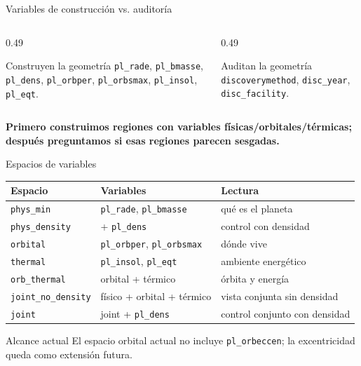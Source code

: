 \documentclass[aspectratio=169,10pt]{beamer}
\newcommand{\takeaway}[1]{\begin{center}\small\textbf{#1}\end{center}}
\begin{document}
\begin{frame}{Variables de construcci\'on vs. auditor\'ia}
  \begin{columns}[T,onlytextwidth]
    \begin{column}{0.49\textwidth}
      \begin{block}{Construyen la geometr\'ia}
        \small
        \texttt{pl\_rade}, \texttt{pl\_bmasse}, \texttt{pl\_dens}, \texttt{pl\_orbper}, \texttt{pl\_orbsmax}, \texttt{pl\_insol}, \texttt{pl\_eqt}.
      \end{block}
    \end{column}
    \begin{column}{0.49\textwidth}
      \begin{alertblock}{Auditan la geometr\'ia}
        \small
        \texttt{discoverymethod}, \texttt{disc\_year}, \texttt{disc\_facility}.
      \end{alertblock}
    \end{column}
  \end{columns}

  \vspace{0.5em}
  \takeaway{Primero construimos regiones con variables f\'isicas/orbitales/t\'ermicas; despu\'es preguntamos si esas regiones parecen sesgadas.}
\end{frame}

\begin{frame}{Espacios de variables}
  \small
  \begin{tabular}{lll}
    \toprule
    Espacio & Variables & Lectura \\
    \midrule
    \texttt{phys\_min} & \texttt{pl\_rade}, \texttt{pl\_bmasse} & qu\'e es el planeta \\
    \texttt{phys\_density} & + \texttt{pl\_dens} & control con densidad \\
    \texttt{orbital} & \texttt{pl\_orbper}, \texttt{pl\_orbsmax} & d\'onde vive \\
    \texttt{thermal} & \texttt{pl\_insol}, \texttt{pl\_eqt} & ambiente energ\'etico \\
    \texttt{orb\_thermal} & orbital + t\'ermico & \'orbita y energ\'ia \\
    \texttt{joint\_no\_density} & f\'isico + orbital + t\'ermico & vista conjunta sin densidad \\
    \texttt{joint} & joint + \texttt{pl\_dens} & control conjunto con densidad \\
    \bottomrule
  \end{tabular}

  \vspace{0.7em}
  \begin{alertblock}{Alcance actual}
    El espacio orbital actual no incluye \texttt{pl\_orbeccen}; la excentricidad queda como extensi\'on futura.
  \end{alertblock}
\end{frame}
\end{document}
